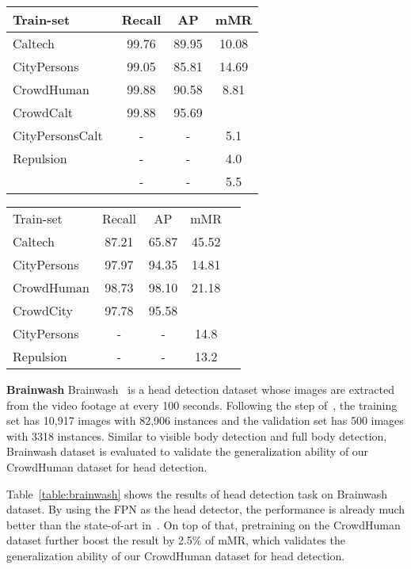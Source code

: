 \documentclass[10pt,twocolumn,letterpaper]{article}
\newcommand{\myparagraph}[1]{{\vspace{0.5em} \noindent \bf #1}}
\begin{document}
\begin{table*}
\parbox{.5\linewidth}{
\centering
\caption{Experimental results on Caltech dataset.}
\label{table:evalCaltech}
\begin{tabular}{lccc}
\hline
Train-set & Recall & AP & mMR\\
\hline
Caltech & {99.76}  & {89.95} & {10.08}\\
CityPersons & {99.05} & {85.81} & {14.69}\\
CrowdHuman & {99.88} & {90.58} & {8.81}\\
CrowdCalt & {99.88} & {95.69} & {}\\
\hline
\hline
CityPersonsCalt~\cite{zhang2017citypersons} & - & - & {5.1}\\
Repulsion~\cite{wang2018Repulsion} & - & - & {4.0}\\
\cite{mao2017can} & - & - & {5.5}\\
\hline
\end{tabular}
}
\hfill
\parbox{.5\linewidth}{
\centering
\caption{Experimental reslts on CityPersons.}
\label{table:evalCity}
\begin{tabular}{lcccc}
\hline\noalign{\smallskip}
Train-set & Recall & AP & mMR\\
\noalign{\smallskip}
\hline
\noalign{\smallskip}
Caltech  & {87.21}  & {65.87} & {45.52}\\
CityPersons & {97.97} & {94.35} & {14.81}\\
CrowdHuman & {98.73} & {98.10} & {21.18}\\
CrowdCity & {97.78} & {95.58} & {}\\
\hline
\hline
CityPersons~\cite{zhang2017citypersons} & - & - & {14.8}\\
Repulsion~\cite{wang2018Repulsion} & - & - & {13.2}\\
\hline
\end{tabular}
}
\end{table*}



\myparagraph{Brainwash} Brainwash~\cite{stewart2016end} is a head detection dataset whose images are extracted from the video footage at every 100 seconds. Following the step of~\cite{stewart2016end}, the training set has 10,917 images with 82,906 instances and the validation set has 500 images with 3318 instances. Similar to visible body detection and full body detection, Brainwash dataset is evaluated to validate the generalization ability of our CrowdHuman dataset for head detection.

Table~\ref{table:brainwash} shows the results of head detection task on Brainwash dataset. By using the FPN as the head detector, the performance is already much better than the state-of-art in~\cite{stewart2016end}. On top of that, pretraining on the CrowdHuman dataset further boost the result by 2.5\% of mMR, which validates the generalization ability of our CrowdHuman dataset for head detection. 
\end{document}
